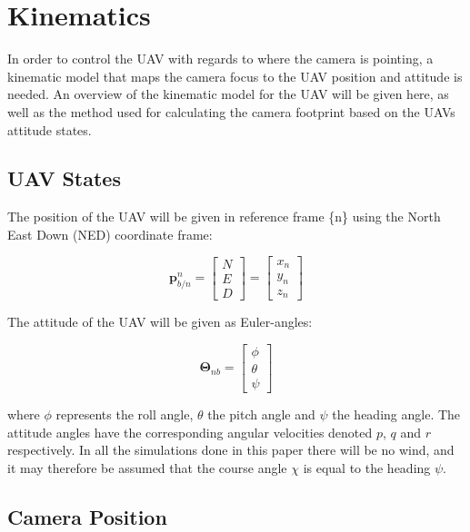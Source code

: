 \section{Kinematics}
\label{ch:kinematics}

In order to control the UAV with regards to where the camera is pointing, a kinematic model that maps the camera focus to the UAV position and attitude is needed. An overview of the kinematic model for the UAV will be given here, as well as the method used for calculating the camera footprint based on the UAVs attitude states.

\subsection{UAV States}
The position of the UAV will be given in reference frame \{n\} using the North East Down (NED) coordinate frame:

\begin{equation}
	\bm{p}_{b/n}^n =
	\begin{bmatrix}
		N \\ E \\ D
	\end{bmatrix}
	=
	\begin{bmatrix}
		x_n \\ y_n \\ z_n
	\end{bmatrix}
\end{equation}

The attitude of the UAV will be given as Euler-angles:

\begin{equation}
	\bm{\Theta}_{nb} = 
	\begin{bmatrix}
		\phi \\ \theta \\ \psi
	\end{bmatrix}
\end{equation}
	
where $\phi$ represents the roll angle, $\theta$ the pitch angle and $\psi$ the heading angle. The attitude angles have the corresponding angular velocities denoted $p$, $q$ and $r$ respectively. In all the simulations done in this paper there will be no wind, and it may therefore be assumed that the course angle $\chi$ is equal to the heading $\psi$.


\subsection{Camera Position}

